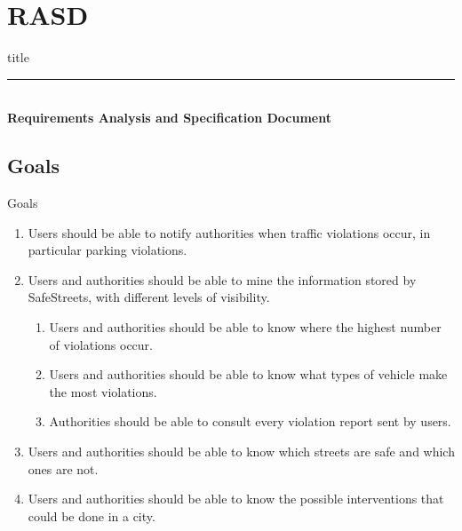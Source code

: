 \section{RASD}

	\begin{frame}[plain]
		\vfill
		\centering
		\begin{beamercolorbox}[sep=8pt,center,shadow=true,rounded=true]{title}
			\textbf{\insertsectionhead}\par%
			\color{polimiblue}\noindent\rule{10cm}{1pt} \\
			\textbf{Requirements Analysis and Specification Document}
		\end{beamercolorbox}
		\vfill
	\end{frame}

	\subsection{Goals}
		\begin{frame}{Goals}
			\vspace{-17pt}
			\begin{enumerate}[label=\textbf{G\arabic*}]\small
				\item \label{goal:notification} Users should be able to notify authorities when traffic violations occur, in particular parking violations.
				\item \label{goal:mining} Users and authorities should be able to mine the information stored by SafeStreets, with different levels of visibility.
				\begin{enumerate}[label=\textbf{G2\Alph*}]
					\item \label{goal:miningA} Users and authorities should be able to know where the highest number of violations occur.
					\item \label{goal:miningB} Users and authorities should be able to know what types of vehicle make the most violations.
					\item \label{goal:miningC} Authorities should be able to consult every violation report sent by users.
				\end{enumerate}
				\item \label{goal:safety} Users and authorities should be able to know which streets are safe and which ones are not.
				\item \label{goal:intervention} Users and authorities should be able to know the possible interventions that could be done in a city.
			\end{enumerate}
		\end{frame}


